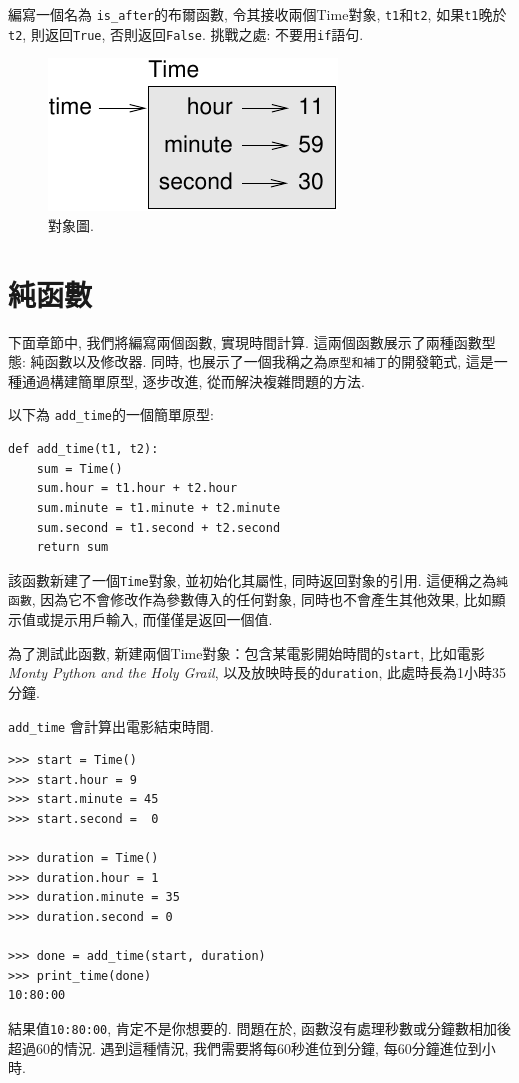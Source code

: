 \documentclass[10pt]{book}
\begin{document}
編寫一個名為 \verb"is_after"的布爾函數, 
令其接收兩個Time對象, {\tt t1}和{\tt t2}, 
如果{\tt t1}晚於{\tt t2}, 則返回{\tt True}, 否則返回{\tt False}. 
挑戰之處: 不要用{\tt if}語句. 

\begin{figure}
\centerline
{\includegraphics[scale=0.8]{figs/time.pdf}}
\caption{對象圖.}
\label{fig.time}
\end{figure}


\section{純函數}

下面章節中, 我們將編寫兩個函數, 實現時間計算. 
這兩個函數展示了兩種函數型態: 純函數以及修改器. 
同時, 也展示了一個我稱之為{\tt 原型和補丁}的開發範式, 
這是一種通過構建簡單原型, 逐步改進, 從而解決複雜問題的方法. 

以下為 \verb"add_time"的一個簡單原型:

\begin{verbatim}
def add_time(t1, t2):
    sum = Time()
    sum.hour = t1.hour + t2.hour
    sum.minute = t1.minute + t2.minute
    sum.second = t1.second + t2.second
    return sum
\end{verbatim}
%
該函數新建了一個{\tt Time}對象, 並初始化其屬性, 同時返回對象的引用. 
這便稱之為{\tt 純函數}, 因為它不會修改作為參數傳入的任何對象, 
同時也不會產生其他效果, 比如顯示值或提示用戶輸入, 而僅僅是返回一個值. 

為了測試此函數, 新建兩個Time對象：包含某電影開始時間的{\tt start}, 
比如電影{\em Monty Python and the Holy Grail},  
以及放映時長的{\tt duration}, 此處時長為1小時35分鐘. 

\verb"add_time" 會計算出電影結束時間. 

\begin{verbatim}
>>> start = Time()
>>> start.hour = 9
>>> start.minute = 45
>>> start.second =  0

>>> duration = Time()
>>> duration.hour = 1
>>> duration.minute = 35
>>> duration.second = 0

>>> done = add_time(start, duration)
>>> print_time(done)
10:80:00
\end{verbatim}
%
結果值{\tt 10:80:00}, 肯定不是你想要的. 
問題在於, 函數沒有處理秒數或分鐘數相加後超過60的情況. 
遇到這種情況, 我們需要將每60秒進位到分鐘, 
每60分鐘進位到小時. 
\end{document}
